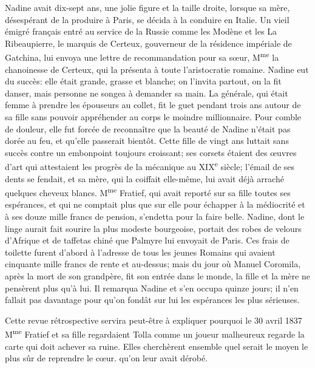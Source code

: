 Nadine avait dix-sept ans, une jolie figure et la taille droite, lorsque
sa mère, désespérant de la produire à Paris, se décida à la conduire en
Italie. Un vieil émigré français entré au service de la Russie comme les
Modène et les La Ribeaupierre, le marquis de Certeux, gouverneur de la
résidence impériale de Gatchina, lui envoya une lettre de recommandation
pour sa sœur, M\textsuperscript{me} la chanoinesse de Certeux, qui la
présenta à toute l'aristocratie romaine. Nadine eut du succès: elle
était grande, grasse et blanche; on l'invita partout, on la fit danser,
mais personne ne songea à demander sa main. La générale, qui était femme
à prendre les épouseurs au collet, fit le guet pendant trois ans autour
de sa fille sans pouvoir appréhender au corps le moindre millionnaire.
Pour comble de douleur, elle fut forcée de reconnaître que la beauté de
Nadine n'était pas dorée au feu, et qu'elle passerait bientôt. Cette
fille de vingt ans luttait sans succès contre un embonpoint toujours
croissant; ses corsets étaient des œuvres d'art qui attestaient les
progrès de la mécanique au XIX\textsuperscript{e} siècle; l'émail de ses
dents se fendait, et sa mère, qui la coiffait elle-même, lui avait déjà
arraché quelques cheveux blancs. M\textsuperscript{me} Fratief, qui
avait reporté sur sa fille toutes ses espérances, et qui ne comptait
plus que sur elle pour échapper à la médiocrité et à ses douze mille
francs de pension, s'endetta pour la faire belle. Nadine, dont le linge
aurait fait sourire la plus modeste bourgeoise, portait des robes de
velours d'Afrique et de taffetas chiné que Palmyre lui envoyait de
Paris. Ces frais de toilette furent d'abord à l'adresse de tous les
jeunes Romains qui avaient cinquante mille francs de rente et au-dessus;
mais du jour où Manuel Coromila, après la mort de son grandpère, fit son
entrée dans le monde, la fille et la mère ne pensèrent plus qu'à lui. Il
remarqua Nadine et s'en occupa quinze jours; il n'en fallait pas
davantage pour qu'on fondât sur lui les espérances les plus sérieuses.

Cette revue rétrospective servira peut-être à expliquer pourquoi le 30
avril 1837 M\textsuperscript{me} Fratief et sa fille regardaient Tolla
comme un joueur malheureux regarde la carte qui doit achever sa ruine.
Elles cherchèrent ensemble quel serait le moyen le plus sûr de reprendre
le cœur. qu'on leur avait dérobé.

